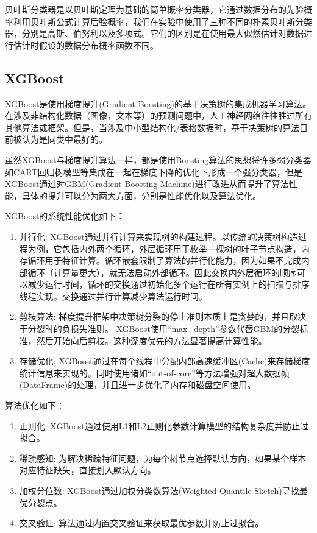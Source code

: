 贝叶斯分类器是以贝叶斯定理为基础的简单概率分类器，它通过数据分布的先验概率利用贝叶斯公式计算后验概率，我们在实验中使用了三种不同的朴素贝叶斯分类器，分别是高斯、伯努利以及多项式。它们的区别是在使用最大似然估计对数据进行估计时假设的数据分布概率函数不同。

\subsection{XGBoost}

XGBoost是使用梯度提升(Gradient Boosting)的基于决策树的集成机器学习算法。在涉及非结构化数据（图像，文本等）的预测问题中，人工神经网络往往胜过所有其他算法或框架。但是，当涉及中小型结构化/表格数据时，基于决策树的算法目前被认为是同类中最好的。

虽然XGBoost与梯度提升算法一样，都是使用Boosting算法的思想将许多弱分类器如CART回归树模型等集成在一起在梯度下降的优化下形成一个强分类器，但是XGBoost通过对GBM(Gradient Boosting Machine)进行改进从而提升了算法性能，具体的提升可以分为两大方面，分别是性能优化以及算法优化。

XGBoost的系统性能优化如下：

\begin{enumerate}
  \item 并行化: XGBoost通过并行计算来实现树的构建过程。以传统的决策树构造过程为例，它包括内外两个循环，外层循环用于枚举一棵树的叶子节点构造，内存循环用于特征计算。循环嵌套限制了算法的并行化能力，因为如果不完成内部循环（计算量更大），就无法启动外部循环。因此交换内外层循环的顺序可以减少运行时间，循环的交换通过初始化多个运行在所有实例上的扫描与排序线程实现。交换通过并行计算减少算法运行时间。
  \item 剪枝算法: 梯度提升框架中决策树分裂的停止准则本质上是贪婪的，并且取决于分裂时的负损失准则。 XGBoost使用“max\_depth”参数代替GBM的分裂标准，然后开始向后剪枝。这种深度优先的方法显著提高计算性能。
  \item 存储优化: XGBoost通过在每个线程中分配内部高速缓冲区(Cache)来存储梯度统计信息来实现的。同时使用诸如“out-of-core”等方法增强对超大数据帧(DataFrame)的处理，并且进一步优化了内存和磁盘空间使用。
\end{enumerate}

算法优化如下：

\begin{enumerate}
  \item 正则化: XGBoost通过使用L1和L2正则化参数计算模型的结构复杂度并防止过拟合。
  \item 稀疏感知: 为解决稀疏特征问题，为每个树节点选择默认方向，如果某个样本对应特征缺失，直接划入默认方向。\cite{XGBoost原理解析}
  \item 加权分位数: XGBoost通过加权分类数算法(Weighted Quantile Sketch)寻找最优分裂点。
  \item 交叉验证: 算法通过内置交叉验证来获取最优参数并防止过拟合。
\end{enumerate}

